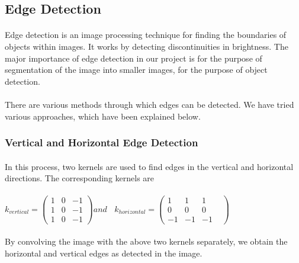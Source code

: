 \documentclass{article}
\begin{document}
	\subsection{Edge Detection}
		\paragraph{}
		Edge detection is an image processing technique for finding the boundaries of objects within images. It works by detecting discontinuities in brightness. The major importance of edge detection in our project is for the purpose of segmentation of the image into smaller images, for the purpose of object detection.

		\paragraph{}
		There are various methods through which edges can be detected. We have tried various approaches, which have been explained below. 

		\subsubsection{Vertical and Horizontal Edge Detection}
		\paragraph{}
		In this process, two kernels are used to find edges in the vertical and horizontal directions. The corresponding kernels are \\ \\
		$k_{vertical} = 
		\left(
		\begin{matrix}
		1 & 0 & -1 \\
		1 & 0 & -1 \\
		1 & 0 & -1
		\end{matrix}
		\right) 
		and\ \ \ \ 
		k_{horizontal} = 
		\left(
		\begin{matrix}
		 1&   1&   1& \\
		 0&   0&   0& \\
		-1&  -1&  -1&
		\end{matrix}
		\right)
		$

		\paragraph{}
		By convolving the image with the above two kernels separately, we obtain the horizontal and vertical edges as detected in the image.
		\\ \\ \\ \\ \\ 
\end{document}
